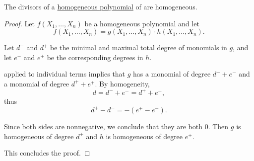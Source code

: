\begin{proposition}\label{thm:divisors_of_homogeneous_polynomial}
  The divisors of a \hyperref[def:homogeneous_polynomial]{homogeneous polynomial} of are homogeneous.
\end{proposition}
\begin{proof}
  Let \( f(X_1, \ldots, X_n) \) be a homogeneous polynomial and let
  \begin{equation*}
    f(X_1, \ldots, X_n) = g(X_1, \ldots, X_n) \cdot h(X_1, \ldots, X_n).
  \end{equation*}

  Let \( d^- \) and \( d^+ \) be the minimal and maximal total degree of monomials in \( g \), and let \( e^- \) and \( e^+ \) be the corresponding degrees in \( h \).

   applied to individual terms implies that \( g \) has a monomial of degree \( d^- + e^- \) and a monomial of degree \( d^+ + e^+ \). By homogeneity,
  \begin{equation*}
    d = d^- + e^- = d^+ + e^+,
  \end{equation*}
  thus
  \begin{equation*}
    d^+ - d^- = - (e^+ - e^-).
  \end{equation*}

  Since both sides are nonnegative, we conclude that they are both \( 0 \). Then \( g \) is homogeneous of degree \( d^+ \) and \( h \) is homogeneous of degree \( e^+ \).

  This concludes the proof.
\end{proof}

